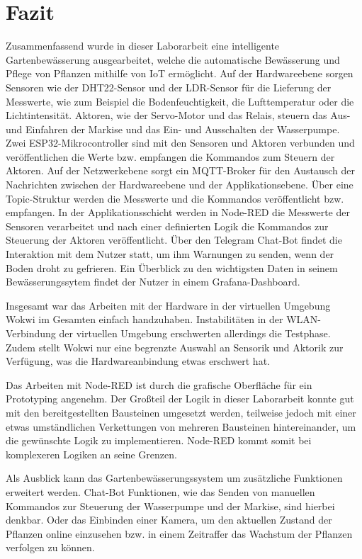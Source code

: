 
\section{Fazit}
Zusammenfassend wurde in dieser Laborarbeit eine intelligente Gartenbewässerung ausgearbeitet, welche die automatische Bewässerung und Pflege von Pflanzen mithilfe von IoT ermöglicht. Auf der Hardwareebene sorgen Sensoren wie der DHT22-Sensor und der LDR-Sensor für die Lieferung der Messwerte, wie zum Beispiel die Bodenfeuchtigkeit, die Lufttemperatur oder die Lichtintensität. Aktoren, wie der Servo-Motor und das Relais, steuern das Aus- und Einfahren der Markise und das Ein- und Ausschalten der Wasserpumpe. Zwei ESP32-Mikrocontroller sind mit den Sensoren und Aktoren verbunden und veröffentlichen die Werte bzw. empfangen die Kommandos zum Steuern der Aktoren. Auf der Netzwerkebene sorgt ein MQTT-Broker für den Austausch der Nachrichten zwischen der Hardwareebene und der Applikationsebene. Über eine Topic-Struktur werden die Messwerte und die Kommandos veröffentlicht bzw. empfangen. In der Applikationsschicht werden in Node-RED die Messwerte der Sensoren verarbeitet und nach einer definierten Logik die Kommandos zur Steuerung der Aktoren veröffentlicht. Über den Telegram Chat-Bot findet die Interaktion mit dem Nutzer statt, um ihm Warnungen zu senden, wenn der Boden droht zu gefrieren. Ein Überblick zu den wichtigsten Daten in seinem Bewässerungssytem findet der Nutzer in einem Grafana-Dashboard.

Insgesamt war das Arbeiten mit der Hardware in der virtuellen Umgebung Wokwi im Gesamten einfach handzuhaben. Instabilitäten in der WLAN-Verbindung der virtuellen Umgebung erschwerten allerdings die Testphase. Zudem stellt Wokwi nur eine begrenzte Auswahl an Sensorik und Aktorik zur Verfügung, was die Hardwareanbindung etwas erschwert hat.

Das Arbeiten mit Node-RED ist durch die grafische Oberfläche für ein Prototyping angenehm. Der Großteil der Logik in dieser Laborarbeit konnte gut mit den bereitgestellten Bausteinen umgesetzt werden, teilweise jedoch mit einer etwas umständlichen Verkettungen von mehreren Bausteinen hintereinander, um die gewünschte Logik zu implementieren. Node-RED kommt somit bei komplexeren Logiken an seine Grenzen.

Als Ausblick kann das Gartenbewässerungssystem um zusätzliche Funktionen erweitert werden. Chat-Bot Funktionen, wie das Senden von manuellen Kommandos zur Steuerung der Wasserpumpe und der Markise, sind hierbei denkbar. Oder das Einbinden einer Kamera, um den aktuellen Zustand der Pflanzen online einzusehen bzw. in einem Zeitraffer das Wachstum der Pflanzen verfolgen zu können.